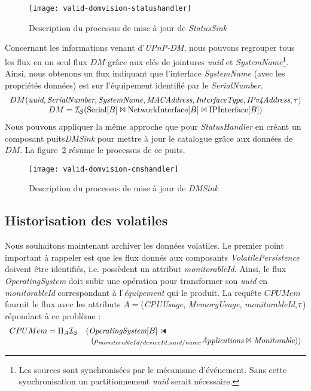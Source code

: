 \begin{figure}[ht]
	\texttt{[image: valid-domvision-statushandler]}
	\caption{Description du processus de mise à jour de \textit{StatusSink}}\label{fig:valid:domvision:statushandler}
\end{figure}

Concernant les informations venant d'\textit{UPnP-DM}, nous pouvons regrouper tous les flux en un seul flux $DM$ grâce aux clés de jointures \textit{uuid} et \textit{SystemName}\footnote{Les sources sont synchronisées par le mécanisme d'événement. Sans cette synchronisation un partitionnement \textit{uuid} serait nécessaire.}. Ainsi, nous obtenons un flux indiquant que l'interface \textit{SystemName} (avec les propriétés données) est sur l'équipement identifié par le \textit{SerialNumber}. 
$$\begin{array}{c} DM(\textit{uuid},\textit{SerialNumber},\textit{SystemName},\textit{MACAddress},\textit{InterfaceType}, \textit{IPv4Address}, \tau)\\
 DM = \mathcal{I_S}(\textrm{Serial}[B] \Join \textrm{NetworkInterface}[B] \Join \textrm{IPInterface}[B])\end{array}$$
Nous pouvons appliquer la même approche que pour \textit{StatusHandler} en créant un composant puits\textit{DMSink} pour mettre à jour le catalogue grâce aux données de $DM$. La figure~\ref{fig:valid:domvision:cmshandler} résume le processus de ce puits.
\begin{figure}[ht]
        \texttt{[image: valid-domvision-cmshandler]}
	\caption{Description du processus de mise à jour de \textit{DMSink}}\label{fig:valid:domvision:cmshandler}
\end{figure}

\subsection{Historisation des volatiles}\label{sec:valid:domvision:requetes:historisation}
Nous souhaitons maintenant archiver les données volatiles. Le premier point important à rappeler est que les flux donnés aux composants \textit{VolatilePersistence} doivent être identifiés, i.e. possèdent un attribut \textit{monitorableId}. Ainsi, le flux \textit{OperatingSystem} doit subir une opération pour transformer son \textit{uuid} en \textit{monitorableId} correspondant à l'\textit{équipement} qui le produit. La requête $CPUMem$ fournit le flux avec les attributs $A=$(\textit{CPUUsage}, \textit{MemoryUsage}, \textit{monitorableId},$\tau$) répondant à ce problème :
$$\begin{array}{rl} CPUMem=\Pi_A \IS & (\textit{OperatingSystem}[B]\ssjoin  \\ & \ \ (\rho_{monitorableId/deviceId,uuid/name}\textit{Applications}\Join \textit{Monitorable}))\end{array}$$

